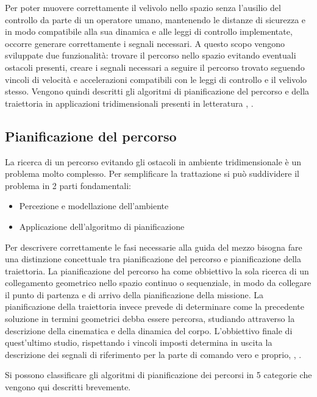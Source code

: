 Per poter muovere correttamente il velivolo nello spazio senza l'ausilio del controllo da parte di un operatore umano, mantenendo le distanze di sicurezza e in modo compatibile alla sua dinamica e alle leggi di controllo implementate, occorre generare correttamente i segnali necessari. A questo scopo vengono sviluppate due funzionalità: trovare il percorso nello spazio evitando eventuali ostacoli presenti, creare i segnali necessari a seguire il percorso trovato seguendo vincoli di velocità e accelerazioni compatibili con le leggi di controllo e il velivolo stesso. Vengono quindi descritti gli algoritmi di pianificazione del percorso e della traiettoria in applicazioni tridimensionali presenti in letteratura \cite{YangLiang2016SoR3}, \cite{PathPlannigOverview}.

\subsection{Pianificazione del percorso}

La ricerca di un percorso evitando gli ostacoli in ambiente tridimensionale è un problema molto complesso. Per semplificare la trattazione si può suddividere il problema in 2 parti fondamentali:
\begin{itemize}
	\item Percezione e modellazione dell'ambiente
	\item Applicazione dell'algoritmo di pianificazione
\end{itemize}

Per descrivere correttamente le fasi necessarie alla guida del mezzo bisogna fare una distinzione concettuale tra pianificazione del percorso e pianificazione della traiettoria. La pianificazione del percorso ha come obbiettivo la sola ricerca di un collegamento geometrico nello spazio continuo o sequenziale, in modo da collegare il punto di partenza e di arrivo della pianificazione della missione. La pianificazione della traiettoria invece prevede di determinare come la precedente soluzione in termini geometrici debba essere percorsa, studiando attraverso la descrizione della cinematica e della dinamica del corpo. L'obbiettivo finale di quest'ultimo studio, rispettando i vincoli imposti determina in uscita la descrizione dei segnali di riferimento per la parte di comando vero e proprio, \cite{YangLiang2016SoR3}, \cite{PathPlannigOverview}.

Si possono classificare gli algoritmi di pianificazione dei percorsi in 5 categorie che vengono qui descritti brevemente.

